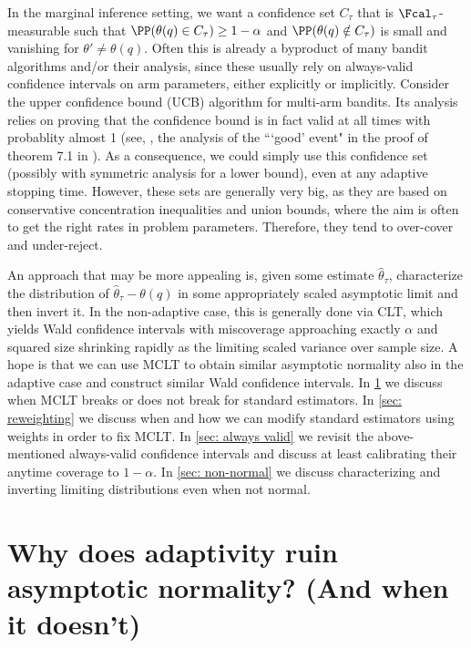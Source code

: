 In the marginal inference setting, we want a confidence set $C_\tau$ that is $\Fcal_\tau$-measurable such that $\PP(\theta(q)\in C_\tau)\geq1-\alpha$ and $\PP(\theta(q)\notin C_\tau)$ is small and vanishing for $\theta'\neq\theta(q)$. Often this is already a byproduct of many bandit algorithms and/or their analysis, since these usually rely on always-valid confidence intervals on arm parameters, either explicitly or implicitly. Consider the upper confidence bound (UCB) algorithm for multi-arm bandits. Its analysis relies on proving that the confidence bound is in fact valid at all times with probablity almost 1 (see, \eg, the analysis of the ```good' event" in the proof of theorem 7.1 in \citealp{lattimore2020bandit}). As a consequence, we could simply use this confidence set (possibly with symmetric analysis for a lower bound), even at any adaptive stopping time. However, these sets are generally very big, as they are based on conservative concentration inequalities and union bounds, where the aim is often to get the right rates in problem parameters. Therefore, they tend to over-cover and under-reject. 

An approach that may be more appealing is, given some estimate $\hat\theta_\tau$, characterize the distribution of $\hat\theta_\tau-\theta(q)$ in some appropriately scaled asymptotic limit and then invert it. In the non-adaptive case, this is generally done via CLT, which yields Wald confidence intervals with miscoverage approaching exactly $\alpha$ and squared size shrinking rapidly as the limiting scaled variance over sample size. A hope is that we can use MCLT to obtain similar asymptotic normality also in the adaptive case and construct similar Wald confidence intervals. In \cref{sec:why_normality_fails} we discuss when MCLT breaks or does not break for standard estimators. In \cref{sec: reweighting} we discuss when and how we can modify standard estimators using weights in order to fix MCLT. In \cref{sec: always valid} we revisit the above-mentioned always-valid confidence intervals and discuss at least calibrating their anytime coverage to $1-\alpha$. In \cref{sec: non-normal} we discuss characterizing and inverting limiting distributions even when not normal.





\section{Why does adaptivity ruin asymptotic normality? (And when it doesn't)}\label{sec:why_normality_fails}

